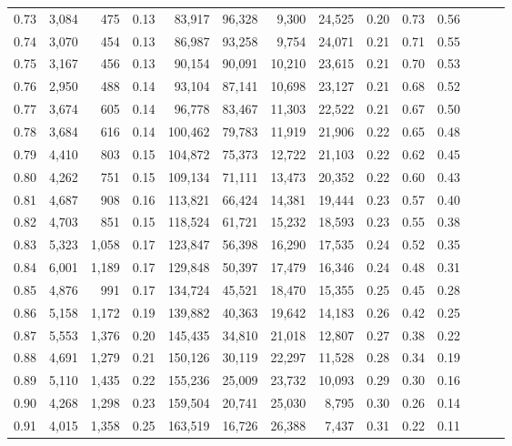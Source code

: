 \begin{tabular}{rrrrrrrrrrrrrr}
0.73 &  3,084 &    475 &  0.13 &   83,917 &   96,328 &   9,300 &  24,525 &  0.20 &  0.73 &      0.56 \\
0.74 &  3,070 &    454 &  0.13 &   86,987 &   93,258 &   9,754 &  24,071 &  0.21 &  0.71 &      0.55 \\
0.75 &  3,167 &    456 &  0.13 &   90,154 &   90,091 &  10,210 &  23,615 &  0.21 &  0.70 &      0.53 \\
0.76 &  2,950 &    488 &  0.14 &   93,104 &   87,141 &  10,698 &  23,127 &  0.21 &  0.68 &      0.52 \\
0.77 &  3,674 &    605 &  0.14 &   96,778 &   83,467 &  11,303 &  22,522 &  0.21 &  0.67 &      0.50 \\
0.78 &  3,684 &    616 &  0.14 &  100,462 &   79,783 &  11,919 &  21,906 &  0.22 &  0.65 &      0.48 \\
0.79 &  4,410 &    803 &  0.15 &  104,872 &   75,373 &  12,722 &  21,103 &  0.22 &  0.62 &      0.45 \\
0.80 &  4,262 &    751 &  0.15 &  109,134 &   71,111 &  13,473 &  20,352 &  0.22 &  0.60 &      0.43 \\
0.81 &  4,687 &    908 &  0.16 &  113,821 &   66,424 &  14,381 &  19,444 &  0.23 &  0.57 &      0.40 \\
0.82 &  4,703 &    851 &  0.15 &  118,524 &   61,721 &  15,232 &  18,593 &  0.23 &  0.55 &      0.38 \\
0.83 &  5,323 &  1,058 &  0.17 &  123,847 &   56,398 &  16,290 &  17,535 &  0.24 &  0.52 &      0.35 \\
0.84 &  6,001 &  1,189 &  0.17 &  129,848 &   50,397 &  17,479 &  16,346 &  0.24 &  0.48 &      0.31 \\
0.85 &  4,876 &    991 &  0.17 &  134,724 &   45,521 &  18,470 &  15,355 &  0.25 &  0.45 &      0.28 \\
0.86 &  5,158 &  1,172 &  0.19 &  139,882 &   40,363 &  19,642 &  14,183 &  0.26 &  0.42 &      0.25 \\
0.87 &  5,553 &  1,376 &  0.20 &  145,435 &   34,810 &  21,018 &  12,807 &  0.27 &  0.38 &      0.22 \\
0.88 &  4,691 &  1,279 &  0.21 &  150,126 &   30,119 &  22,297 &  11,528 &  0.28 &  0.34 &      0.19 \\
0.89 &  5,110 &  1,435 &  0.22 &  155,236 &   25,009 &  23,732 &  10,093 &  0.29 &  0.30 &      0.16 \\
0.90 &  4,268 &  1,298 &  0.23 &  159,504 &   20,741 &  25,030 &   8,795 &  0.30 &  0.26 &      0.14 \\
0.91 &  4,015 &  1,358 &  0.25 &  163,519 &   16,726 &  26,388 &   7,437 &  0.31 &  0.22 &      0.11 \\

\end{tabular}
